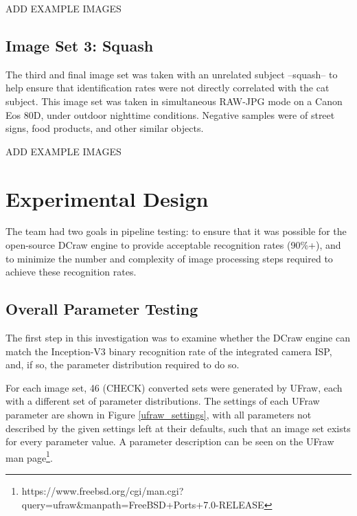 \documentclass{report}
\begin{document}
		ADD EXAMPLE IMAGES
		\subsection{Image Set 3: Squash}
		The third and final image set was taken with an unrelated subject --squash-- to help ensure that identification rates were not directly correlated with the cat subject. This image set was taken in simultaneous RAW-JPG mode on a Canon Eos 80D, under outdoor nighttime conditions. Negative samples were of street signs, food products, and other similar objects.
		
		ADD EXAMPLE IMAGES
	\section{Experimental Design}
		The team had two goals in pipeline testing: to ensure that it was possible for the open-source DCraw engine to provide acceptable recognition rates (90\%+), and to minimize the number and complexity of image processing steps required to achieve these recognition rates.
		\subsection{Overall Parameter Testing}
		The first step in this investigation was to examine whether the DCraw engine can match the Inception-V3 binary recognition rate of the integrated camera ISP, and, if so, the parameter distribution required to do so.
		
		For each image set, 46 (CHECK) converted sets were generated by UFraw, each with a different set of parameter distributions. The settings of each UFraw parameter are shown in Figure \ref{ufraw_settings}, with all parameters not described by the given settings left at their defaults, such that an image set exists for every parameter value. A parameter description can be seen on the UFraw man page\footnote{https://www.freebsd.org/cgi/man.cgi?query=ufraw\&manpath=FreeBSD+Ports+7.0-RELEASE}.
		
\end{document}

